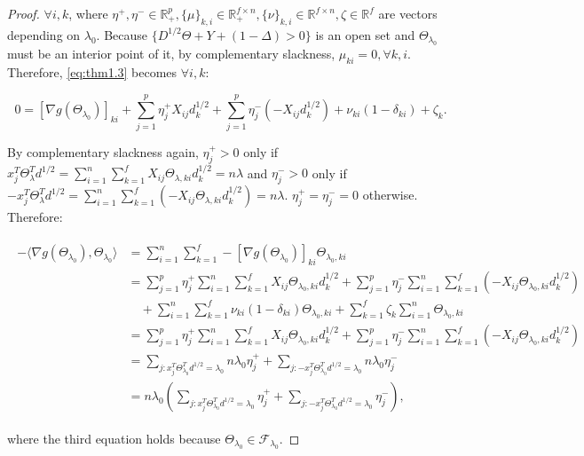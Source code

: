 \documentclass{article}
\begin{document}
\begin{proof}
$\forall i,k$, where $\eta^+,\eta^-\in\mathbb{R}^p_+,\{\mu\}_{k,i}\in\mathbb{R}^{f\times n}_+,\{\nu\}_{k,i}\in\mathbb{R}^{f\times n},\zeta\in\mathbb{R}^f$ are vectors depending on $\lambda_0$. Because $\{D^{1/2}\Theta+Y+(1-\Delta)>0\}$ is an open set and $\Theta_{\lambda_0}$ must be an interior point of it, by complementary slackness, $\mu_{ki}=0,\forall k,i$. Therefore, \eqref{eq:thm1.3} becomes $\forall i,k$:

\begin{equation}
    \label{eq:thm1.4}
    0=[\nabla g(\Theta_{\lambda_0})]_{ki}+\sum_{j=1}^p\eta^+_jX_{ij}d_k^{1/2}+\sum_{j=1}^p\eta^-_j(-X_{ij}d_k^{1/2})+\nu_{ki}(1-\delta_{ki})+\zeta_k.
\end{equation}

By complementary slackness again, $\eta^+_j>0$ only if $x_j^T\Theta_\lambda^Td^{1/2}=\sum_{i=1}^n\sum_{k=1}^fX_{ij}\Theta_{\lambda,ki}d_k^{1/2}=n\lambda$ and $\eta^-_j>0$ only if $-x_j^T\Theta_\lambda^Td^{1/2}=\sum_{i=1}^n\sum_{k=1}^f(-X_{ij}\Theta_{\lambda,ki}d_k^{1/2})=n\lambda$. $\eta^+_j=\eta^-_j=0$ otherwise. Therefore:

\begin{gather}
    \label{eq:thm1.5}
    \begin{aligned}
        -\langle\nabla g(\Theta_{\lambda_0}),\Theta_{\lambda_0}\rangle&=\sum_{i=1}^n\sum_{k=1}^f-[\nabla g(\Theta_{\lambda_0})]_{ki}\Theta_{\lambda_0,ki}\\
        &=\sum_{j=1}^p\eta^+_j\sum_{i=1}^n\sum_{k=1}^fX_{ij}\Theta_{\lambda_0,ki}d_k^{1/2}+\sum_{j=1}^p\eta^-_j\sum_{i=1}^n\sum_{k=1}^f(-X_{ij}\Theta_{\lambda_0,ki}d_k^{1/2})\\&\quad+\sum_{i=1}^n\sum_{k=1}^f\nu_{ki}(1-\delta_{ki})\Theta_{\lambda_0,ki}+\sum_{k=1}^f\zeta_{k}\sum_{i=1}^n\Theta_{\lambda_0,ki}\\
        &=\sum_{j=1}^p\eta^+_j\sum_{i=1}^n\sum_{k=1}^fX_{ij}\Theta_{\lambda_0,ki}d_k^{1/2}+\sum_{j=1}^p\eta^-_j\sum_{i=1}^n\sum_{k=1}^f(-X_{ij}\Theta_{\lambda_0,ki}d_k^{1/2})\\
        &=\sum_{j:x_j^T\Theta_{\lambda_0}^Td^{1/2}=\lambda_0}n\lambda_0\eta_j^++\sum_{j:-x_j^T\Theta_{\lambda_0}^Td^{1/2}=\lambda_0}n\lambda_0\eta_j^-\\
        &=n\lambda_0\left(\sum_{j:x_j^T\Theta_{\lambda_0}^Td^{1/2}=\lambda_0}\eta_j^++\sum_{j:-x_j^T\Theta_{\lambda_0}^Td^{1/2}=\lambda_0}\eta_j^-\right),
    \end{aligned}
\end{gather}

where the third equation holds because $\Theta_{\lambda_0}\in\mathcal{F}_{\lambda_0}$.


\end{proof}
\end{document}
